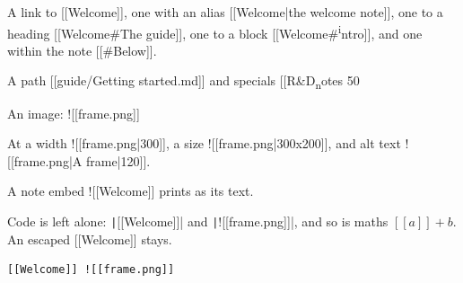 A link to [[Welcome]], one with an alias [[Welcome|the welcome note]], one to a heading [[Welcome\#The guide]], one to a block [[Welcome\#\textsuperscript{i}ntro]], and one within the note [[\#Below]].

A path [[guide/Getting started.md]] and specials [[R\&D\textsubscript{n}otes 50

An image: ![[frame.png]]

At a width ![[frame.png|300]], a size ![[frame.png|300x200]], and alt text ![[frame.png|A frame|120]].

A note embed ![[Welcome]] prints as its text.

Code is left alone: \texttt|[[Welcome]]| and \texttt|![[frame.png]]|, and so is maths $[[a]] + b$. An escaped [[Welcome]] stays.

\begin{verbatim}
[[Welcome]] ![[frame.png]]
\end{verbatim}

